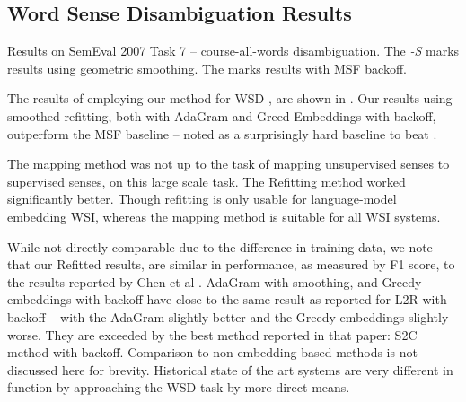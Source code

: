 \documentclass{article}
\def\parencite{\cite}
\begin{document}
\subsection{Word Sense Disambiguation Results} \label{WSDtask}
\begin{table}
	\begin{adjustbox}{max width=\columnwidth}
	\end{adjustbox}

	\caption{Results on SemEval 2007 Task 7 -- course-all-words disambiguation.
	The \emph{-S} marks results using geometric smoothing.
	The \emph{\textasteriskcentered } marks results with MSF backoff.
	} \label{samevalres}
\end{table}

The results of employing our method for WSD , are shown in . Our results using smoothed refitting, both with AdaGram and Greed Embeddings with backoff, outperform the MSF baseline -- noted as a surprisingly hard baseline to beat \parencite{Chen2014}.

The mapping method \parencite{agirre2006}  was not up to the task of mapping unsupervised senses to supervised senses, on this large scale task. The Refitting method worked significantly better. Though refitting is only usable for language-model embedding WSI, whereas the mapping method is suitable for all WSI systems.

While not directly comparable due to the difference in training data, we note that our Refitted results, are similar in performance, as measured by F1 score, to the results reported by Chen et al .
AdaGram with smoothing, and Greedy embeddings with backoff have close to the same result as reported for L2R with backoff -- with the AdaGram slightly better and the Greedy embeddings slightly worse. They are exceeded by the best method reported in that paper: S2C method with backoff.
Comparison to non-embedding based methods is not discussed here for brevity.
Historical state of the art systems are very different in function by approaching the WSD task by more direct means. %
\end{document}

